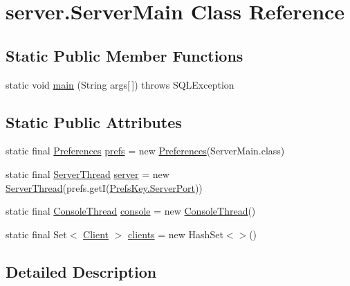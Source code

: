 \hypertarget{classserver_1_1_server_main}{}\section{server.\+Server\+Main Class Reference}
\label{classserver_1_1_server_main}
\subsection*{Static Public Member Functions}
\begin{DoxyCompactItemize}
\item 
static void \hyperlink{classserver_1_1_server_main_a8813a033bf50655c4dbe0e00508f854d}{main} (String args\mbox{[}$\,$\mbox{]})  throws S\+Q\+L\+Exception 
\end{DoxyCompactItemize}
\subsection*{Static Public Attributes}
\begin{DoxyCompactItemize}
\item 
static final \hyperlink{classsharedlib_1_1utils_1_1_preferences}{Preferences} \hyperlink{classserver_1_1_server_main_ad846c85619320e3c5503175b3156c6ce}{prefs} = new \hyperlink{classsharedlib_1_1utils_1_1_preferences}{Preferences}(Server\+Main.\+class)
\item 
static final \hyperlink{classserver_1_1conn_1_1_server_thread}{Server\+Thread} \hyperlink{classserver_1_1_server_main_ab0941f19c36879a7b6b36f9d3c163909}{server} = new \hyperlink{classserver_1_1conn_1_1_server_thread}{Server\+Thread}(prefs.\+getI(\hyperlink{enumserver_1_1other_1_1_prefs_key_a97c1897d83b59cf6735643e3b50d549b}{Prefs\+Key.\+Server\+Port}))
\item 
static final \hyperlink{classserver_1_1other_1_1_console_thread}{Console\+Thread} \hyperlink{classserver_1_1_server_main_ad8e92f0aa15ba52ea24b2dd7b9bab924}{console} = new \hyperlink{classserver_1_1other_1_1_console_thread}{Console\+Thread}()
\item 
static final Set$<$ \hyperlink{classserver_1_1conn_1_1_client}{Client} $>$ \hyperlink{classserver_1_1_server_main_a9b8ba17f17513631d15fa701692dd82f}{clients} = new Hash\+Set$<$$>$()
\end{DoxyCompactItemize}


\subsection{Detailed Description}


